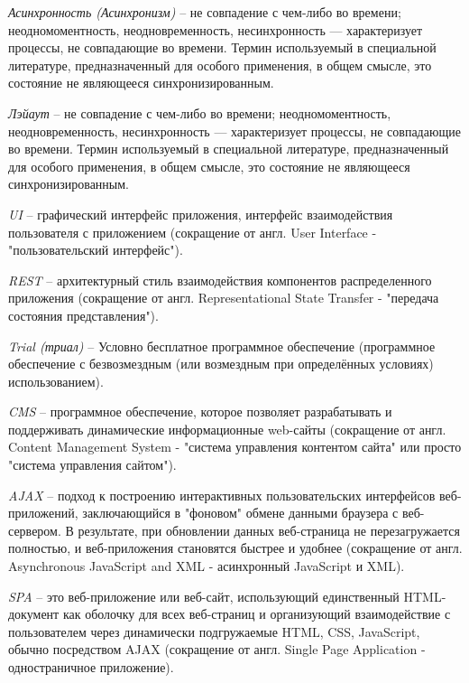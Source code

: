 \label{sec:definitions}

\emph{Асинхронность (Асинхронизм)} -- не совпадение с чем-либо во времени; неодномоментность, неодновременность, несинхронность — характеризует процессы, не совпадающие во времени. Термин используемый в специальной литературе, предназначенный для особого применения, в общем смысле, это состояние не являющееся синхронизированным.

\emph{Лэйаут} -- не совпадение с чем-либо во времени; неодномоментность, неодновременность, несинхронность — характеризует процессы, не совпадающие во времени. Термин используемый в специальной литературе, предназначенный для особого применения, в общем смысле, это состояние не являющееся синхронизированным.

\emph{UI} -- графический интерфейс приложения, интерфейс взаимодействия пользователя с приложением (сокращение от англ. User Interface - "пользовательский интерфейс").

\emph{REST} -- архитектурный стиль взаимодействия компонентов распределенного приложения (сокращение от англ. Representational State Transfer - "передача состояния представления").

\emph{Trial (триал)} -- Условно бесплатное программное обеспечение (программное обеспечение с безвозмездным (или возмездным при определённых условиях) использованием).

\emph{CMS} -- программное обеспечение, которое позволяет разрабатывать и поддерживать динамические информационные web-сайты (сокращение от англ. Content Management System - "система управления контентом сайта" или просто "система управления сайтом").

\emph{AJAX} -- подход к построению интерактивных пользовательских интерфейсов веб-приложений, заключающийся в "фоновом" обмене данными браузера с веб-сервером. В результате, при обновлении данных веб-страница не перезагружается полностью, и веб-приложения становятся быстрее и удобнее (сокращение от англ. Asynchronous JavaScript and XML - асинхронный JavaScript и XML).

\emph{SPA} -- это веб-приложение или веб-сайт, использующий единственный HTML-документ как оболочку для всех веб-страниц и организующий взаимодействие с пользователем через динамически подгружаемые HTML, CSS, JavaScript, обычно посредством AJAX (сокращение от англ. Single Page Application - одностраничное приложение).

\label{sec:introduction}

